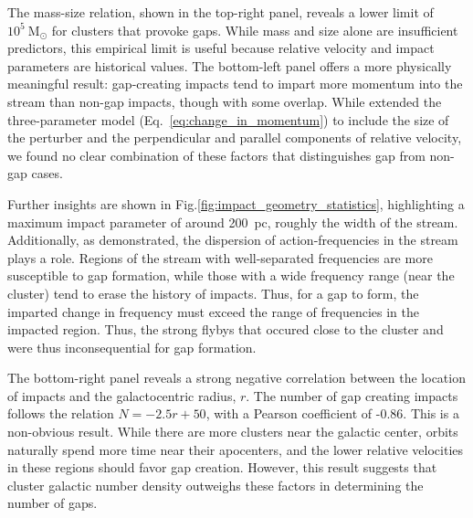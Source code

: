 \documentclass{aa}
\begin{document}
    The mass-size relation, shown in the top-right panel, reveals a lower limit of $10^5~\textrm{M}_{\odot}$ for clusters that provoke gaps. While mass and size alone are insufficient predictors, this empirical limit is useful because relative velocity and impact parameters are historical values. The bottom-left panel offers a more physically meaningful result: gap-creating impacts tend to impart more momentum into the stream than non-gap impacts, though with some overlap. While \citet{2015MNRAS.450.1136E} extended the three-parameter model (Eq.~\ref{eq:change_in_momentum}) to include the size of the perturber and the perpendicular and parallel components of relative velocity, we found no clear combination of these factors that distinguishes gap from non-gap cases.
    
    Further insights are shown in Fig.\ref{fig:impact_geometry_statistics}, highlighting a maximum impact parameter of around 200~pc, roughly the width of the stream. Additionally, as \citet{2016MNRAS.457.3817S} demonstrated, the dispersion of action-frequencies in the stream plays a role. Regions of the stream with well-separated frequencies are more susceptible to gap formation, while those with a wide frequency range (near the cluster) tend to erase the history of impacts. Thus, for a gap to form, the imparted change in frequency must exceed the range of frequencies in the impacted region. Thus, the strong flybys that occured close to the cluster and were thus inconsequential for gap formation.


    The bottom-right panel reveals a strong negative correlation between the location of impacts and the galactocentric radius, $r$. The number of gap creating impacts follows the relation $N = -2.5r + 50$, with a Pearson coefficient of -0.86. This is a non-obvious result. While there are more clusters near the galactic center, orbits naturally spend more time near their apocenters, and the lower relative velocities in these regions should favor gap creation. However, this result suggests that cluster galactic number density outweighs these factors in determining the number of gaps.
\end{document}
